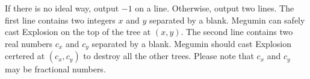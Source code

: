If there is no ideal way, output $-1$ on a line.
Otherwise, output two lines.
The first line contains two integers $x$ and $y$ separated by a blank.
Megumin can safely cast Explosion on the top of the tree at $(x,y)$.
The second line contains two real numbers $c_x$ and $c_y$ 
separated by a blank. 
Megumin should cast Explosion certered at $(c_x,c_y)$ to destroy all the other
trees.
Please note that $c_x$ and $c_y$ may be fractional numbers.
